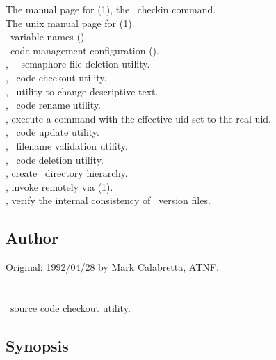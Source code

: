 The manual page for (1), the \rcs\ checkin command.\\
The unix manual page for (1).\\
\aipspp\ variable names ().\\
\aipspp\ code management configuration ().\\
, \aipspp\ \rcs\ semaphore file deletion utility.\\
, \aipspp\ code checkout utility.\\
, \aipspp\ utility to change descriptive text.\\
, \aipspp\ code rename utility.\\
, execute a command with the effective uid set to the real uid.\\
, \aipspp\ code update utility.\\
, \aipspp\ filename validation utility.\\
, \aipspp\ code deletion utility.\\
, create \aipspp\ directory hierarchy.\\
, invoke  remotely via (1).\\
, verify the internal consistency of \rcs\ version files.

\subsection*{Author}

Original: 1992/04/28 by Mark Calabretta, ATNF.


\newpage
\section{}
\label{ao}

\aipspp\ source code checkout utility.

\subsection*{Synopsis}

\begin{synopsis}
\end{synopsis}

